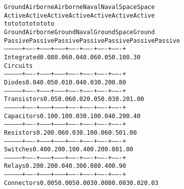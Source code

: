 \begin{boxedminipage}{\funcwidth}
\begin{alltt}
              {\textbar}Ground {\textbar}Airborne{\textbar}Airborne{\textbar}Naval  {\textbar}Naval  {\textbar}Space  {\textbar}Space  {\textbar}
              {\textbar}Active {\textbar}Active  {\textbar}Active  {\textbar}Active {\textbar}Active {\textbar}Active {\textbar}Active {\textbar}
              {\textbar}to     {\textbar}to      {\textbar}to      {\textbar}to     {\textbar}to     {\textbar}to     {\textbar}to     {\textbar}
              {\textbar}Ground {\textbar}Airborne{\textbar}Ground  {\textbar}Naval  {\textbar}Ground {\textbar}Space  {\textbar}Ground {\textbar}
              {\textbar}Passive{\textbar}Passive {\textbar}Passive {\textbar}Passive{\textbar}Passive{\textbar}Passive{\textbar}Passive{\textbar}
--------------+-------+--------+--------+-------+-------+-------+-------+
Integrated    {\textbar} 0.08  {\textbar}  0.06  {\textbar}  0.04  {\textbar} 0.06  {\textbar} 0.05  {\textbar} 0.10  {\textbar} 0.30  {\textbar}
Circuits      {\textbar}       {\textbar}        {\textbar}        {\textbar}       {\textbar}       {\textbar}       {\textbar}       {\textbar}
--------------+-------+--------+--------+-------+-------+-------+-------+
Diodes        {\textbar} 0.04  {\textbar}  0.05  {\textbar}  0.01  {\textbar} 0.04  {\textbar} 0.03  {\textbar} 0.20  {\textbar} 0.80  {\textbar}
--------------+-------+--------+--------+-------+-------+-------+-------+
Transistors   {\textbar} 0.05  {\textbar}  0.06  {\textbar}  0.02  {\textbar} 0.05  {\textbar} 0.03  {\textbar} 0.20  {\textbar} 1.00  {\textbar}
--------------+-------+--------+--------+-------+-------+-------+-------+
Capacitors    {\textbar} 0.10  {\textbar}  0.10  {\textbar}  0.03  {\textbar} 0.10  {\textbar} 0.04  {\textbar} 0.20  {\textbar} 0.40  {\textbar}
--------------+-------+--------+--------+-------+-------+-------+-------+
Resistors     {\textbar} 0.20  {\textbar}  0.06  {\textbar}  0.03  {\textbar} 0.10  {\textbar} 0.06  {\textbar} 0.50  {\textbar} 1.00  {\textbar}
--------------+-------+--------+--------+-------+-------+-------+-------+
Switches      {\textbar} 0.40  {\textbar}  0.20  {\textbar}  0.10  {\textbar} 0.40  {\textbar} 0.20  {\textbar} 0.80  {\textbar} 1.00  {\textbar}
--------------+-------+--------+--------+-------+-------+-------+-------+
Relays        {\textbar} 0.20  {\textbar}  0.20  {\textbar}  0.04  {\textbar} 0.30  {\textbar} 0.08  {\textbar} 0.40  {\textbar} 0.90  {\textbar}
--------------+-------+--------+--------+-------+-------+-------+-------+
Connectors    {\textbar} 0.005 {\textbar}  0.005 {\textbar}  0.003 {\textbar} 0.008 {\textbar} 0.003 {\textbar} 0.02  {\textbar} 0.03  {\textbar}

\end{alltt}
\end{boxedminipage}
